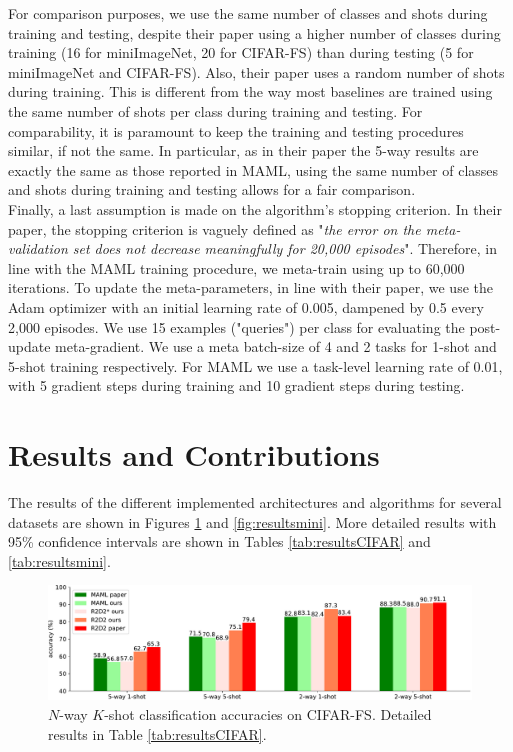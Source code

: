 For comparison purposes, we use the same number of classes and shots during training and testing, despite their paper using a higher number of classes during training (16 for miniImageNet, 20 for \textsc{CIFAR-FS}) than during testing (5 for miniImageNet and \textsc{CIFAR-FS}). Also, their paper uses a random number of shots during training. This is different from the way most baselines are trained using the same number of shots per class during training and testing\supercite{MAML,reptile,vinyals}. For comparability, it is paramount to keep the training and testing procedures similar, if not the same. In particular, as in their paper the 5-way results are exactly the same as those reported in MAML\supercite{finn}, using the same number of classes and shots during training and testing allows for a fair comparison.\\


Finally, a last assumption is made on the algorithm's stopping criterion. In their paper, the stopping criterion is vaguely defined as "\textit{the error on the meta-validation set does not decrease meaningfully for 20,000 episodes}". Therefore, in line with the MAML training procedure, we meta-train using up to 60,000 iterations. To update the meta-parameters, in line with their paper, we use the Adam optimizer\supercite{adam} with an initial learning rate of 0.005, dampened by 0.5 every 2,000 episodes. We use 15 examples ("queries") per class for evaluating the post-update meta-gradient. We use a meta batch-size of 4 and 2 tasks for 1-shot and 5-shot training respectively. For MAML we use a task-level learning rate of 0.01, with 5 gradient steps during training and 10 gradient steps during testing.


\section{Results and Contributions}
\label{res}

The results of the different implemented architectures and algorithms for several datasets are shown in Figures \ref{fig:resultsCIFAR} and \ref{fig:resultsmini}. More detailed results with 95\% confidence intervals are shown in Tables \ref{tab:resultsCIFAR} and \ref{tab:resultsmini}.
%
\begin{figure}[htbp]
  \includegraphics[width=\textwidth]{CIFAR-FS.pdf}
  \vspace{-.5cm}
  \caption{$N$-way $K$-shot classification accuracies on \textsc{CIFAR-FS}. Detailed results in Table \ref{tab:resultsCIFAR}.}
  \label{fig:resultsCIFAR}
\end{figure}

